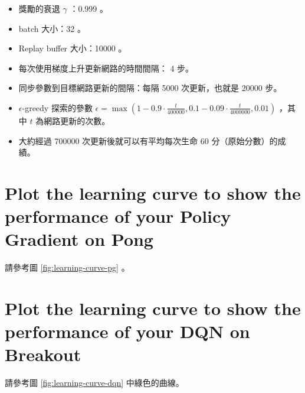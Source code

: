 \documentclass[fleqn,a4paper,12pt]{article}
\begin{document}
\begin{itemize}
\item 獎勵的衰退 $\gamma$ ：0.999 。
\item batch 大小：32 。
\item Replay buffer 大小：10000 。
\item 每次使用梯度上升更新網路的時間間隔： 4 步。
\item 同步參數到目標網路更新的間隔：每隔 5000 次更新，也就是 20000 步。
\item $\epsilon$-greedy 探索的參數 $\epsilon = \max(1 -  0.9 \cdot \frac{t}{400000}, 0.1 - 0.09 \cdot \frac{t}{4000000}, 0.01)$ ，其中 $t$ 為網路更新的次數。
\item 大約經過 700000 次更新後就可以有平均每次生命 60 分（原始分數）的成績。
\end{itemize}

\section{Plot the learning curve to show the performance of your Policy Gradient on Pong}

請參考圖 \ref{fig:learning-curve-pg} 。

\section{Plot the learning curve to show the performance of your DQN on Breakout}

請參考圖 \ref{fig:learning-curve-dqn} 中綠色的曲線。
\end{document}
